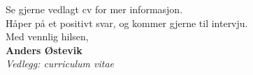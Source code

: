 \documentclass[11pt, norsk]{article}
\begin{document}

Se gjerne vedlagt cv for mer informasjon.\\[1.5em]

Håper på et positivt svar, og kommer gjerne til intervju.\\[3em]

Med vennlig hilsen,\\[2em] %
%
{\bfseries Anders Østevik}\\
%
\vfill%
{\slshape Vedlegg: curriculum vitae{}}

\newpage


\end{document}
